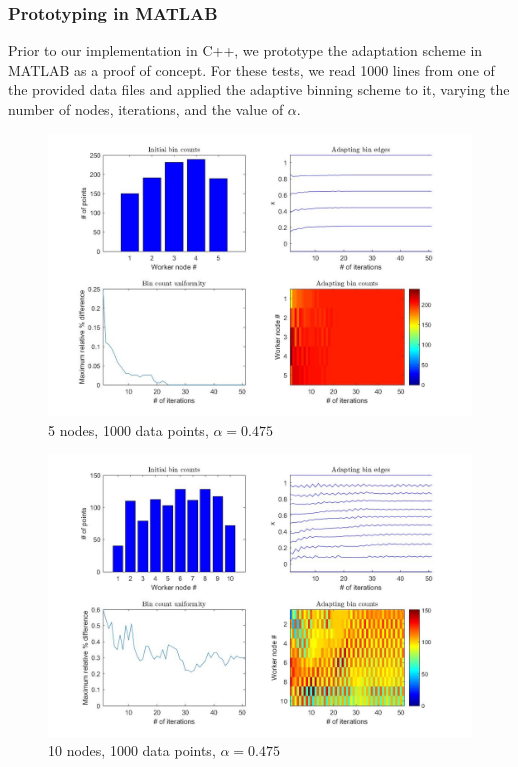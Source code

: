 \documentclass{article}
\begin{document}
\subsubsection{Prototyping in MATLAB}
Prior to our implementation in C++, we prototype the adaptation scheme in MATLAB as a proof of concept. For these tests, we read 1000 lines from one of the provided data files and applied the adaptive binning scheme to it, varying the number of nodes, iterations, and the value of $\alpha$.
\begin{figure}[!htb]
	\centering
	\vspace{-5pt}
	\includegraphics[scale = 0.25]{AdaptiveBinning_5Nodes_1000Lines_0475alpha}
	\vspace{-10pt}
	\caption{5 nodes, 1000 data points, $\alpha = 0.475$}
	\label{5,0.475}
\end{figure}
\begin{figure}[!htb]
	\centering
	\vspace{-5pt}
	\includegraphics[scale = 0.25]{AdaptiveBinning_10Nodes_1000Lines_0475alpha}
	\vspace{-10pt}
	\caption{10 nodes, 1000 data points, $\alpha = 0.475$}
	\label{10,0.475}
\end{figure}
\end{document}
